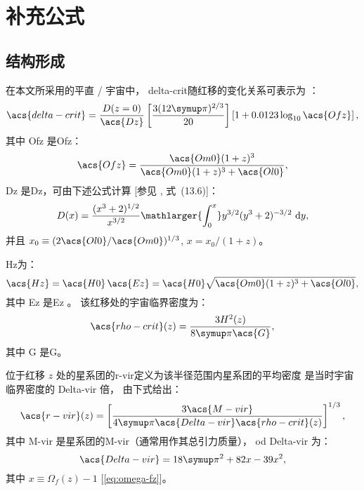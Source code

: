 
\chapter{补充公式}
\label{chap:formulas}

\section{结构形成}

在本文所采用的平直 \lcdm/ 宇宙中，
\ac{delta-crit}随红移的变化关系可表示为 \cite{kitayama1996,randall2002}：
\begin{equation}
  \label{eq:delta-crit}
  \acs{delta-crit} = \frac{D(z=0)}{\acs{Dz}}
    \left[ \frac{3 (12\Cpi)^{2/3}}{20} \right]
    \left[1 + 0.0123 \log_{10} \acs{Ofz} \right] ,
\end{equation}
其中 \acs{Ofz} 是\acl{Ofz}：
\begin{equation}
  \label{eq:omega-fz}
  \acs{Ofz} = \frac{\acs{Om0} (1+z)^3}{\acs{Om0} (1+z)^3 + \acs{Ol0}} ,
\end{equation}
\acs{Dz} 是\acl{Dz}，可由下述公式计算
[参见 , 式~(13.6)]：
\begin{equation}
  \label{eq:growth-factor}
  D(x) = \frac{(x^3 + 2)^{1/2}}{x^{3/2}}
    \mathlarger{\int_0^x} y^{3/2} (y^3 + 2)^{-3/2} \,\D{y} ,
\end{equation}
并且 $x_0 \equiv (2 \acs{Ol0}/\acs{Om0})^{1/3}$,
$x = x_0 / (1+z)$。

\acl{Hz}为：
\begin{equation}
  \label{eq:hubble-z}
  \acs{Hz} = \acs{H0} \, \acs{Ez}
    = \acs{H0} \sqrt{\acs{Om0} (1+z)^3 + \acs{Ol0}} ,
\end{equation}
其中 \acs{Ez} 是\acl{Ez} \cite{hogg1999}。
该红移处的宇宙临界密度为：
\begin{equation}
  \label{eq:rho-crit}
  \acs{rho-crit}(z) = \frac{3 H^2(z)}{8 \Cpi \acs{G}} ,
\end{equation}
其中 \acs{G} 是\acl{G}。

位于红移 $z$ 处的星系团的\acf{r-vir}定义为该半径范围内星系团的平均密度
是当时宇宙临界密度的 \acs{Delta-vir} 倍，
由下式给出：
\begin{equation}
  \label{eq:radius-virial}
  \acs{r-vir}(z) = \left[
    \frac{3 \acs{M-vir}}{4\Cpi \acs{Delta-vir} \acs{rho-crit}(z)}
  \right]^{1/3},
\end{equation}
其中 \acs{M-vir} 是星系团的\acl{M-vir}（通常用作其总引力质量），
\acf{od} \acs{Delta-vir} 为\cite{bryan1998}：
\begin{equation}
  \label{eq:delta-vir}
  \acs{Delta-vir} = 18\Cpi^2 + 82 x - 39 x^2,
\end{equation}
其中 $x \equiv \Omega_f(z) - 1$ [\autoref{eq:omega-fz}]。


